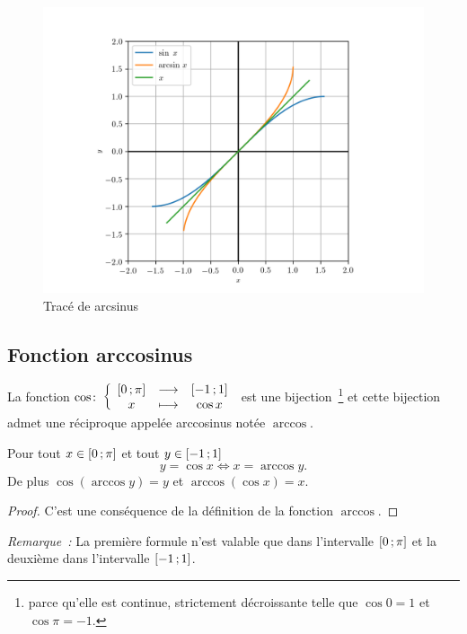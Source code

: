 \begin{figure}
  \centering
  \includegraphics[scale = 0.8]{arcsin.png}
  \caption{Tracé de arcsinus}\label{fig:tracearcsinus}
\end{figure}

\subsection{Fonction arccosinus}\label{subsec:chap1-fonctionarccos}

\begin{defdef}
  La fonction 
  \(\cos\colon\left\{\begin{array}{ccc}\left[ 0 \, ; {} \pi \right] & \longrightarrow &\left[ -1 \, ; {} 1 \right]\\x & \longmapsto & \cos x\end{array}\right.\) 
  est une bijection~\footnote{parce qu'elle est continue, strictement 
  décroissante telle que \(\cos 0 = 1\) et \(\cos \pi = -1\).} et cette 
  bijection admet une réciproque appelée arccosinus notée \(\arccos\).
\end{defdef}

\begin{prop}
  Pour tout \(x \in \left[ 0 \, ; {} \pi \right]\) et tout \(y \in 
  \left[ -1 \, ; {} 1 \right]\)
  \begin{equation}
    y = \cos x \iff x = \arccos y.
  \end{equation}
  De plus \(\cos( \arccos y) = y\) et \(\arccos(\cos x) = x\).
\end{prop}

\begin{proof}
  C'est une conséquence de la définition de la fonction \(\arccos\).
\end{proof}

\emph{Remarque~:} La première formule n'est valable que dans l'intervalle 
\(\left[ 0 \, ; {} \pi \right]\) et la deuxième dans l'intervalle 
\(\left[ -1 \, ; {} 1 \right]\).

